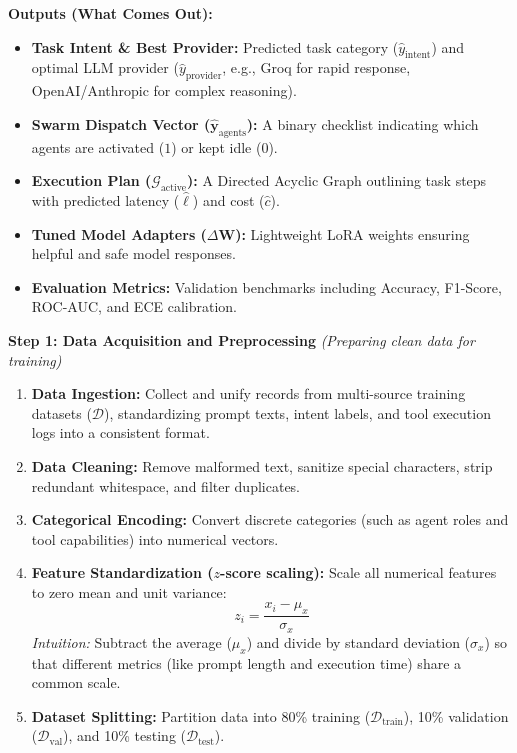 \documentclass[11pt,a4paper]{article}
\begin{document}
\vspace{0.25em}
\textbf{Outputs (What Comes Out):}
\begin{itemize}[leftmargin=1.5em, itemsep=0.18em, topsep=0.04em]
    \item \textbf{Task Intent \& Best Provider:} Predicted task category ($\hat{y}_{\text{intent}}$) and optimal LLM provider ($\hat{y}_{\text{provider}}$, e.g., Groq for rapid response, OpenAI/Anthropic for complex reasoning).
    \item \textbf{Swarm Dispatch Vector ($\hat{\mathbf{y}}_{\text{agents}}$):} A binary checklist indicating which agents are activated ($1$) or kept idle ($0$).
    \item \textbf{Execution Plan ($\mathcal{G}_{\text{active}}$):} A Directed Acyclic Graph outlining task steps with predicted latency ($\hat{\ell}$) and cost ($\hat{c}$).
    \item \textbf{Tuned Model Adapters ($\Delta \mathbf{W}$):} Lightweight LoRA weights ensuring helpful and safe model responses.
    \item \textbf{Evaluation Metrics:} Validation benchmarks including Accuracy, F1-Score, ROC-AUC, and ECE calibration.
\end{itemize}

\vspace{0.35em}
\textbf{Step 1: Data Acquisition and Preprocessing} \emph{(Preparing clean data for training)}
\begin{enumerate}[leftmargin=1.5em, itemsep=0.22em, topsep=0.06em]
    \item \textbf{Data Ingestion:} Collect and unify records from multi-source training datasets ($\mathcal{D}$), standardizing prompt texts, intent labels, and tool execution logs into a consistent format.
    \item \textbf{Data Cleaning:} Remove malformed text, sanitize special characters, strip redundant whitespace, and filter duplicates.
    \item \textbf{Categorical Encoding:} Convert discrete categories (such as agent roles and tool capabilities) into numerical vectors.
    \item \textbf{Feature Standardization ($z$-score scaling):} Scale all numerical features to zero mean and unit variance:
    \[
    z_i = \frac{x_i - \mu_x}{\sigma_x}
    \]
    \emph{Intuition:} Subtract the average ($\mu_x$) and divide by standard deviation ($\sigma_x$) so that different metrics (like prompt length and execution time) share a common scale.
    \item \textbf{Dataset Splitting:} Partition data into 80\% training ($\mathcal{D}_{\text{train}}$), 10\% validation ($\mathcal{D}_{\text{val}}$), and 10\% testing ($\mathcal{D}_{\text{test}}$).
\end{enumerate}
\end{document}
